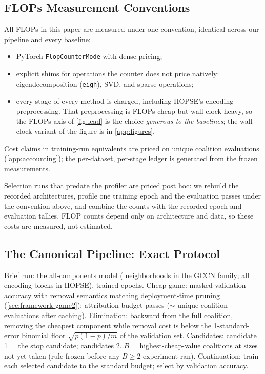 \subsection{FLOPs Measurement Conventions}
\label{app:flops-conventions}

All FLOPs in this paper are measured under one convention, identical
across our pipeline and every baseline:
\begin{itemize}
  \item PyTorch \texttt{FlopCounterMode} with dense pricing;
  \item explicit shims for operations the counter does not price
    natively: eigendecomposition (\texttt{eigh}), SVD, and sparse
    operations;
  \item every stage of every method is charged, including HOPSE's
    encoding preprocessing. That preprocessing is FLOPs-cheap but
    wall-clock-heavy, so the FLOPs axis of \cref{fig:lead} is the
    choice \emph{generous to the baselines}; the wall-clock variant of
    the figure is in \cref{app:figures}.
\end{itemize}
Cost claims in training-run equivalents are priced on unique coalition
evaluations (\cref{app:accounting}); the per-dataset,
per-stage ledger is generated from the frozen measurements.

Selection runs that predate the profiler are priced post hoc: we
rebuild the recorded architectures, profile one training epoch and the
evaluation passes under the convention above, and combine the counts
with the recorded epoch and evaluation tallies. FLOP counts depend
only on architecture and data, so these costs are measured, not
estimated.

\subsection{The Canonical Pipeline: Exact Protocol}
\label{app:pipeline-protocol}

Brief run: the all-components model
(\unfrozen{\ResNumNeighborhoods} neighborhoods in the GCCN family; all
encoding blocks in HOPSE), trained \unfrozen{\ResStemEpochs} epochs.
Cheap game: masked validation accuracy with removal semantics matching
deployment-time pruning (\cref{sec:framework-game2}); attribution
budget \unfrozen{\ResSampledPasses} passes
($\sim$\unfrozen{\ResUniqueEvals} unique coalition evaluations after
caching). Elimination: backward from the full coalition,
removing the cheapest component while removal cost is below the
1-standard-error binomial floor $\sqrt{p(1-p)/m}$ of the validation
set. Candidates: candidate 1 = the stop candidate; candidates $2..B$
= highest-cheap-value coalitions at sizes not yet taken (rule frozen
before any $B \ge 2$ experiment ran). Continuation: train each
selected candidate to the standard budget; select by validation
accuracy.

